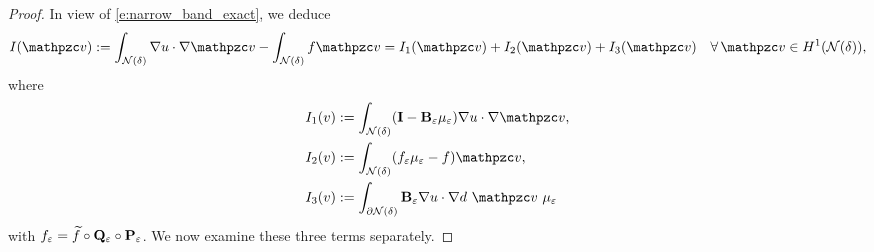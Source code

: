 \begin{proof}
In view of \eqref{e:narrow_band_exact}, we deduce
$$
I(\tv) := \int_{\mathcal N(\delta)} \nabla u \cdot \nabla \tv - \int_{\mathcal N(\delta)} f \tv
= I_1(\tv) + I_2(\tv) + I_3(\tv)
\quad\forall \, \tv \in H^1(\Nd),
$$
%
where
%
\begin{align*}
 I_1(v) &:= \int_{\mathcal N(\delta)} (\bI - \bB_\varepsilon \mu_\varepsilon) \nabla u \cdot \nabla \tv,
  \\
  I_2(v) &:= \int_{\mathcal N(\delta)} (f_\varepsilon \mu_\varepsilon - f)  \tv,
  \\
  I_3(v) &:= \int_{\partial \mathcal N(\delta)} \bB_\varepsilon \nabla u \cdot \nabla d ~ \tv ~\mu_\varepsilon
\end{align*}
%
with $f_\varepsilon=\widetilde{f} \circ {\bf Q}_\varepsilon \circ {\bf P}_\varepsilon$.
%
We now examine these three terms separately.


\end{proof}
